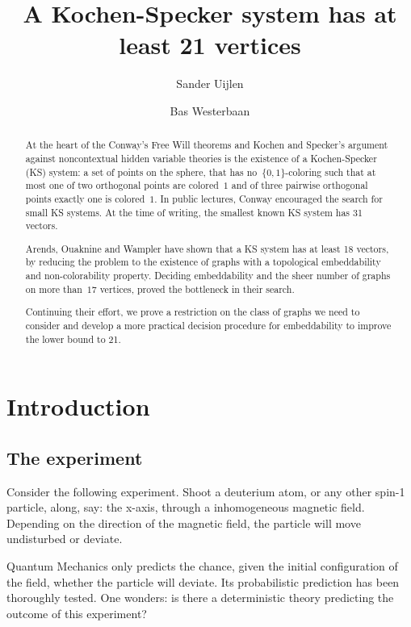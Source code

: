 \documentclass[a4paper]{article}
\title{A Kochen-Specker system has at least 21 vertices}
\author{Sander Uijlen}
\author{Bas Westerbaan}
\affil{Institute for Computing and Information Sciences\\
       Radboud Universiteit Nijmegen\\
   \{\texttt{suijlen},\texttt{bwesterb}\}\texttt{@cs.ru.nl}}
\theoremstyle{definition}
\theoremstyle{remark}
\begin{document}
\maketitle

\begin{abstract}
    At the heart of the Conway's Free Will theorems and Kochen and Specker's
        argument against noncontextual hidden variable theories
    is the existence of a Kochen-Specker (KS) system:
    a set of points on the sphere,
    that has no~$\{0,1\}$-coloring such that
    at most one of two orthogonal points are colored~$1$
    and of three pairwise orthogonal points exactly one
    is colored~$1$.
    In public lectures, Conway encouraged the search for small
    KS systems.  
    At the time of writing, the smallest known
    KS system has 31 vectors.  

    Arends, Ouaknine and Wampler have shown that a KS system has at least
    18 vectors, by reducing the problem to the existence of graphs
    with a topological embeddability and non-colorability property.
    Deciding embeddability and the sheer number of graphs on more than~$17$
    vertices, proved the bottleneck in their search.

    Continuing their effort, we prove a restriction on the class of graphs
    we need to consider and develop a more practical decision procedure for
    embeddability to improve the lower bound to 21.
\end{abstract}
    
\section{Introduction}

\subsection{The experiment}

Consider the following experiment.  Shoot a deuterium atom,
or any other spin-1 particle,
along, say: the x-axis, through a inhomogeneous magnetic field.
Depending on the direction of the magnetic field,
the particle will move undisturbed
or deviate.

Quantum Mechanics only predicts the chance, given the initial configuration
of the field, whether the particle will deviate.
Its probabilistic prediction has been thoroughly tested.
One wonders: is there a deterministic theory predicting the
outcome of this experiment?
\end{document}

